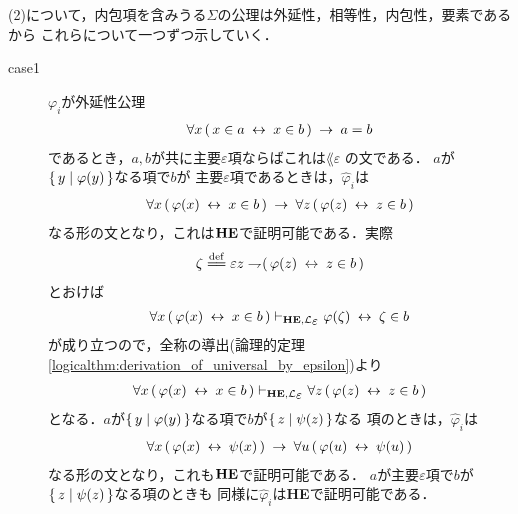 \begin{metaprf}
		(2)について，内包項を含みうる$\Sigma$の公理は外延性，相等性，内包性，要素であるから
		これらについて一つずつ示していく．
		\begin{description}
			\item[case1] $\varphi_{i}$が外延性公理
				\begin{align}
					\forall x\, (\, x \in a \hspace{0.25em}\leftrightarrow\hspace{0.25em} x \in b\, ) \hspace{0.25em}\rightarrow\hspace{0.25em} a = b
				\end{align}
				であるとき，$a,b$が共に主要$\varepsilon$項ならばこれは$\lang{\varepsilon}$
				の文である．
				$a$が$\{\, y \mid \varphi(y)\, \}$なる項で$b$が
				主要$\varepsilon$項であるときは，$\widehat{\varphi}_{i}$は
				\begin{align}
					\forall x\, (\, \varphi(x) \hspace{0.25em}\leftrightarrow\hspace{0.25em} x \in b\, ) \hspace{0.25em}\rightarrow\hspace{0.25em} 
					\forall z\, (\, \varphi(z) \hspace{0.25em}\leftrightarrow\hspace{0.25em} z \in b\, )
				\end{align}
				なる形の文となり，これは${\bf HE}$で証明可能である．実際
				\begin{align}
					\zeta \defeq \varepsilon z \negation (\, \varphi(z) \lrarrow z \in b\, )
				\end{align}
				とおけば
				\begin{align}
					\forall x\, (\, \varphi(x) \lrarrow x \in b\, ) 
					\provable{\mbox{{\bf HE}},\lang{\varepsilon}} \varphi(\zeta) \lrarrow \zeta \in b
				\end{align}
				が成り立つので，全称の導出(論理的定理\ref{logicalthm:derivation_of_universal_by_epsilon})より
				\begin{align}
					\forall x\, (\, \varphi(x) \lrarrow x \in b\, ) 
					\provable{\mbox{{\bf HE}},\lang{\varepsilon}}
					\forall z\, (\, \varphi(z) \lrarrow z \in b\, )
				\end{align}
				となる．$a$が$\{\, y \mid \varphi(y)\, \}$なる項で$b$が$\{\, z \mid \psi(z)\, \}$なる
				項のときは，$\widehat{\varphi}_{i}$は
				\begin{align}
					\forall x\, (\, \varphi(x) \hspace{0.25em}\leftrightarrow\hspace{0.25em} \psi(x)\, ) \hspace{0.25em}\rightarrow\hspace{0.25em} 
					\forall u\, (\, \varphi(u) \hspace{0.25em}\leftrightarrow\hspace{0.25em} \psi(u)\, )
				\end{align}
				なる形の文となり，これも${\bf HE}$で証明可能である．
				$a$が主要$\varepsilon$項で$b$が$\{\, z \mid \psi(z)\, \}$なる項のときも
				同様に$\widehat{\varphi}_{i}$は{\bf HE}で証明可能である．
			

\end{description}
\end{metaprf}

